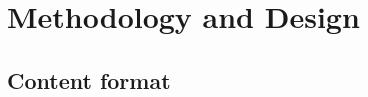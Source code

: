 \documentclass[12pt,a4paper]{article}  %
\begin{document}






\section{Methodology and Design}

\subsection{Content format}
\end{document}
